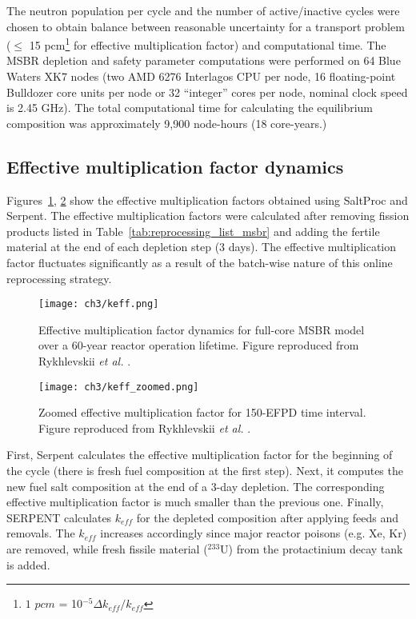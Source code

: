 The neutron population per cycle and the number of active/inactive cycles were 
chosen to obtain balance between reasonable uncertainty for a transport 
problem ($\leq$ 15 pcm\footnote{ $1$ $pcm$ = 10$^{-5}\Delta k_{eff}/k_{eff}$} 
for effective multiplication factor) and computational time. The \gls{MSBR} 
depletion and safety parameter computations were performed on 64 Blue Waters 
XK7 nodes (two AMD 6276 Interlagos CPU per node, 16 floating-point Bulldozer 
core units per node or 32 ``integer'' cores per node, nominal clock speed is 
2.45 GHz). The total computational time for calculating the equilibrium 
composition was approximately 9,900 node-hours (18 core-years.)

\subsection{Effective multiplication factor dynamics}
Figures~\ref{fig:keff}, \ref{fig:keff_zoomed} show the effective multiplication 
factors obtained using SaltProc and Serpent. The effective multiplication 
factors were calculated after removing fission products listed 
in  Table~\ref{tab:reprocessing_list_msbr} and adding the fertile material at 
the end of each depletion step (3 days). The effective multiplication factor 
fluctuates significantly as a result of the batch-wise nature of this online 
reprocessing strategy. 
\begin{figure}[ht!] 
	\centering
	\texttt{[image: ch3/keff.png]}
	\caption{Effective multiplication factor dynamics for full-core \gls{MSBR} 
		model over a 60-year reactor operation lifetime. Figure reproduced 
		from Rykhlevskii \emph{et al.} \cite{rykhlevskii_modeling_2019}.}
	\label{fig:keff}
\end{figure}
\begin{figure}[ht!] 
	\centering
	\texttt{[image: ch3/keff\_zoomed.png]}
	\caption{Zoomed effective multiplication factor for 150-EFPD time 
	interval. Figure reproduced from Rykhlevskii \emph{et al.}  
	\cite{rykhlevskii_modeling_2019}.}
	\label{fig:keff_zoomed}
\end{figure}

First, Serpent calculates the effective multiplication factor for the  
beginning of the cycle (there is fresh fuel composition at the first step). 
Next, it computes the new fuel salt composition at the end of a 3-day 
depletion. The corresponding effective multiplication factor is much smaller 
than the previous one. Finally, SERPENT calculates $k_{eff}$ for the depleted 
composition after applying feeds and removals. The $k_{eff}$ increases 
accordingly since major reactor poisons (e.g. Xe, Kr) are removed, while fresh 
fissile material ($^{233}$U) from the protactinium decay tank is added.  

